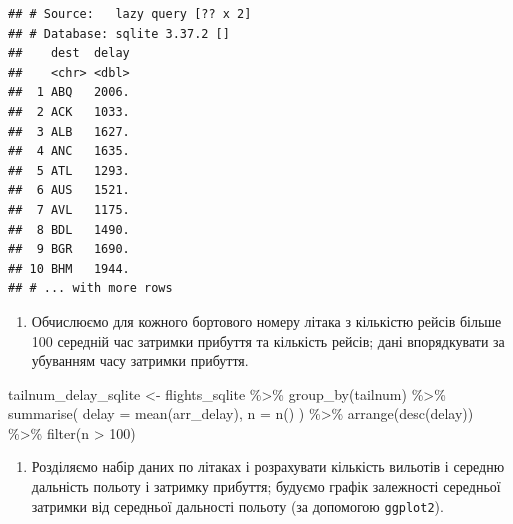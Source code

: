 \documentclass[
]{book}
\newenvironment{Shaded}{\begin{snugshade}}{\end{snugshade}}
\newcommand{\AttributeTok}[1]{\textcolor[rgb]{0.77,0.63,0.00}{#1}}
\newcommand{\DecValTok}[1]{\textcolor[rgb]{0.00,0.00,0.81}{#1}}
\newcommand{\FunctionTok}[1]{\textcolor[rgb]{0.00,0.00,0.00}{#1}}
\newcommand{\NormalTok}[1]{#1}
\newcommand{\OtherTok}[1]{\textcolor[rgb]{0.56,0.35,0.01}{#1}}
\newcommand{\SpecialCharTok}[1]{\textcolor[rgb]{0.00,0.00,0.00}{#1}}
\providecommand{\tightlist}{%
  \setlength{\itemsep}{0pt}\setlength{\parskip}{0pt}}
\begin{document}
\begin{verbatim}
## # Source:   lazy query [?? x 2]
## # Database: sqlite 3.37.2 []
##    dest  delay
##    <chr> <dbl>
##  1 ABQ   2006.
##  2 ACK   1033.
##  3 ALB   1627.
##  4 ANC   1635.
##  5 ATL   1293.
##  6 AUS   1521.
##  7 AVL   1175.
##  8 BDL   1490.
##  9 BGR   1690.
## 10 BHM   1944.
## # ... with more rows
\end{verbatim}

\begin{enumerate}
\def\labelenumi{\arabic{enumi}.}
\setcounter{enumi}{5}
\tightlist
\item
  Обчислюємо для кожного бортового номеру літака з кількістю рейсів більше 100 середній час затримки прибуття та кількість рейсів; дані впорядкувати за убуванням часу затримки прибуття.
\end{enumerate}

\begin{Shaded}
\begin{Highlighting}[]
\NormalTok{tailnum\_delay\_sqlite }\OtherTok{\textless{}{-}}\NormalTok{ flights\_sqlite }\SpecialCharTok{\%\textgreater{}\%} 
  \FunctionTok{group\_by}\NormalTok{(tailnum) }\SpecialCharTok{\%\textgreater{}\%}
  \FunctionTok{summarise}\NormalTok{(}
    \AttributeTok{delay =} \FunctionTok{mean}\NormalTok{(arr\_delay),}
    \AttributeTok{n =} \FunctionTok{n}\NormalTok{()}
\NormalTok{  ) }\SpecialCharTok{\%\textgreater{}\%} 
  \FunctionTok{arrange}\NormalTok{(}\FunctionTok{desc}\NormalTok{(delay)) }\SpecialCharTok{\%\textgreater{}\%}
  \FunctionTok{filter}\NormalTok{(n }\SpecialCharTok{\textgreater{}} \DecValTok{100}\NormalTok{)}
\end{Highlighting}
\end{Shaded}

\begin{enumerate}
\def\labelenumi{\arabic{enumi}.}
\setcounter{enumi}{6}
\tightlist
\item
  Розділяємо набір даних по літаках і розрахувати кількість вильотів і середню дальність польоту і затримку прибуття; будуємо графік залежності середньої затримки від середньої дальності польоту (за допомогою \texttt{ggplot2}).
\end{enumerate}
\end{document}
